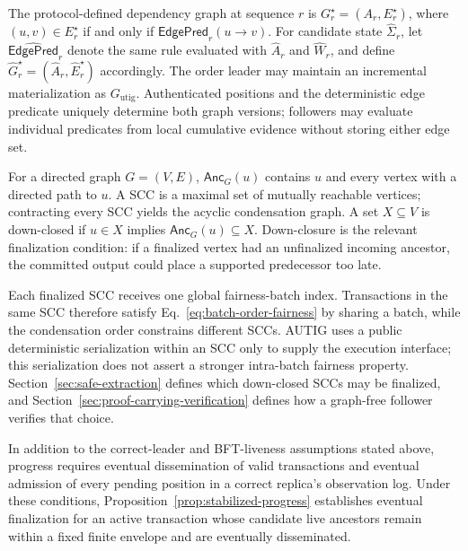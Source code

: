 The protocol-defined dependency graph at sequence $r$ is
$G_r^\star=(A_r,E_r^\star)$, where $(u,v)\in E_r^\star$ if and only if $\mathsf{EdgePred}_r(u\to v)$.  For candidate state
$\widehat\Sigma_r$, let $\widehat{\mathsf{EdgePred}}_r$ denote the same rule evaluated with $\widehat A_r$ and $\widehat W_r$, and define $\widehat G_r^\star=(\widehat A_r,\widehat E_r^\star)$ accordingly.
The order leader may maintain an incremental materialization as
$G_{\mathrm{utig}}$.  Authenticated positions and the deterministic edge predicate uniquely determine both graph versions; followers may evaluate individual predicates from local cumulative evidence without storing either edge set.

For a directed graph $G=(V,E)$, $\mathsf{Anc}_G(u)$ contains $u$ and every vertex with a directed path to $u$.  A SCC is a maximal set of mutually reachable vertices; contracting every SCC yields the acyclic condensation graph.  A set $X\subseteq V$ is down-closed if $u\in X$ implies $\mathsf{Anc}_G(u)\subseteq X$.  Down-closure is the relevant finalization condition: if a finalized vertex had an unfinalized incoming ancestor, the committed output could place a supported predecessor too late.

Each finalized SCC receives one global fairness-batch index.  Transactions in the same SCC therefore satisfy Eq.~\eqref{eq:batch-order-fairness} by sharing a batch, while the condensation order constrains different SCCs.  AUTIG uses a
public deterministic serialization within an SCC only to supply the execution interface; this serialization does not assert a stronger intra-batch fairness property.  Section~\ref{sec:safe-extraction} defines which down-closed SCCs may be finalized, and Section~\ref{sec:proof-carrying-verification} defines how a graph-free follower verifies that choice.

In addition to the correct-leader and BFT-liveness assumptions stated above, progress requires eventual dissemination of valid transactions and eventual admission of every pending position in a correct replica's observation log. Under these conditions, Proposition~\ref{prop:stabilized-progress} establishes eventual finalization for an active transaction whose candidate live ancestors remain within a fixed finite envelope and are eventually disseminated.









